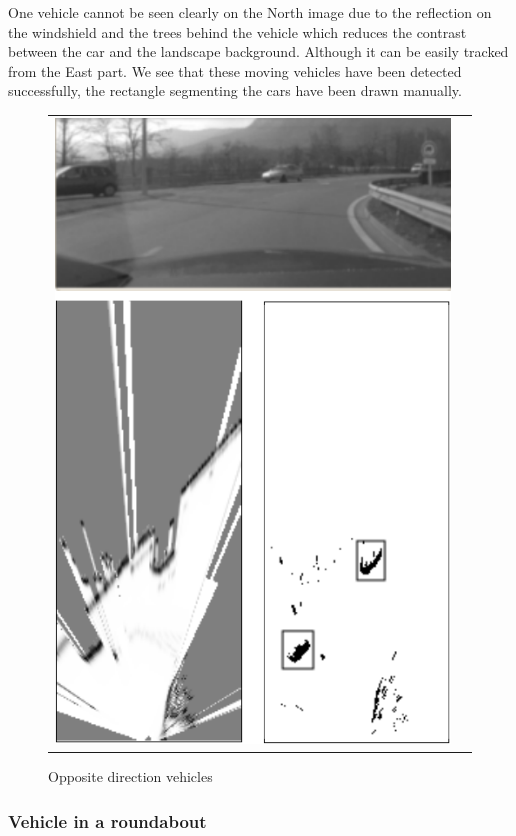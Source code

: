 One vehicle cannot be seen clearly on the North image due to the reflection on the windshield and the trees behind the vehicle which reduces the contrast between the car and the landscape background. Although it can be easily tracked from the East part. We see that these moving vehicles have been detected successfully, the rectangle segmenting the cars have been drawn manually.

\begin{figure}[H]
   \centering
     \begin{tabular}{lr}
       \includegraphics[scale=0.60]{img/fig:result:scenetwocars}
     \end{tabular}
   \caption{Opposite direction vehicles}
   \label{fig:result:scenetwocars}
\end{figure}

\subsubsection{Vehicle in a roundabout}

